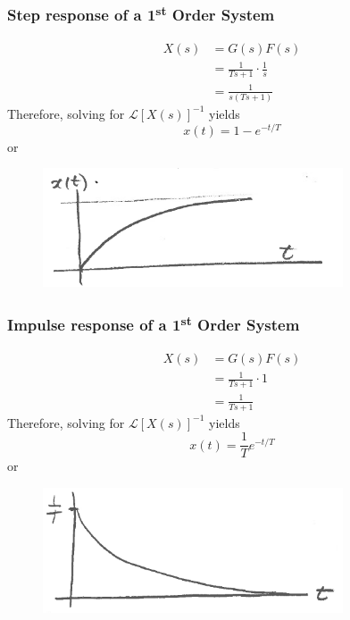 \documentclass[12pt,letter]{article}
\numberwithin{ex}{section} %
\numberwithin{re}{section} %
\newcommand{\Laplace}[1]{\ensuremath{\mathcal{L}{\left[#1\right]}}}
\numberwithin{equation}{section}	%
\begin{document}
\subsubsection{Step response of a 1\textsuperscript{st} Order System}

\begin{align}
X(s) &= G(s)F(s) \\
&= \frac{1}{Ts+1} \cdot \frac{1}{s} \nonumber \\
&= \frac{1}{s(Ts+1)}
\end{align}
Therefore, solving for $\Laplace{X(s)}^{-1}$ yields
\begin{equation}
x(t) = 1-e^{-t/T}
\end{equation}
or
\begin{figure}[H]
	\centering
	\includegraphics[width=3.5in]{../figures/x_t_time_response}
\end{figure}


\subsubsection{Impulse response of a 1\textsuperscript{st} Order System}


\begin{align}
X(s) &= G(s)F(s) \\
&= \frac{1}{Ts+1} \cdot 1 \nonumber \\
&= \frac{1}{Ts+1}
\end{align}
Therefore, solving for $\Laplace{X(s)}^{-1}$ yields
\begin{equation}
x(t) = \frac{1}{T}e^{-t/T}
\end{equation}
or
\begin{figure}[H]
	\centering
	\includegraphics[width=3.5in]{../figures/x_t_impulse_time_response}
\end{figure}
\end{document}
